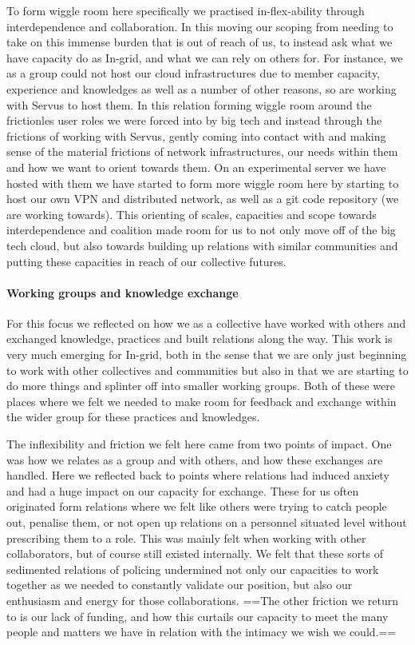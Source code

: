 To form wiggle room here specifically we practised in-flex-ability
through interdependence and collaboration. In this moving our scoping
from needing to take on this immense burden that is out of reach of us,
to instead ask what we have capacity do as In-grid, and what we can rely
on others for. For instance, we as a group could not host our cloud
infrastructures due to member capacity, experience and knowledges as
well as a number of other reasons, so are working with Servus to host
them. In this relation forming wiggle room around the frictionles user
roles we were forced into by big tech and instead through the frictions
of working with Servus, gently coming into contact with and making sense
of the material frictions of network infrastructures, our needs within
them and how we want to orient towards them. On an experimental server
we have hosted with them we have started to form more wiggle room here
by starting to host our own VPN and distributed network, as well as a
git code repository (we are working towards). This orienting of scales,
capacities and scope towards interdependence and coalition made room for
us to not only move off of the big tech cloud, but also towards building
up relations with similar communities and putting these capacities in
reach of our collective futures.

\hypertarget{working-groups-and-knowledge-exchange}{%
\paragraph{Working groups and knowledge
exchange}\label{working-groups-and-knowledge-exchange}}

For this focus we reflected on how we as a collective have worked with
others and exchanged knowledge, practices and built relations along the
way. This work is very much emerging for In-grid, both in the sense that
we are only just beginning to work with other collectives and
communities but also in that we are starting to do more things and
splinter off into smaller working groups. Both of these were places
where we felt we needed to make room for feedback and exchange within
the wider group for these practices and knowledges.

The inflexibility and friction we felt here came from two points of
impact. One was how we relates as a group and with others, and how these
exchanges are handled. Here we reflected back to points where relations
had induced anxiety and had a huge impact on our capacity for exchange.
These for us often originated form relations where we felt like others
were trying to catch people out, penalise them, or not open up relations
on a personnel situated level without prescribing them to a role. This
was mainly felt when working with other collaborators, but of course
still existed internally. We felt that these sorts of sedimented
relations of policing undermined not only our capacities to work
together as we needed to constantly validate our position, but also our
enthusiasm and energy for those collaborations. ==The other friction we
return to is our lack of funding, and how this curtails our capacity to
meet the many people and matters we have in relation with the intimacy
we wish we could.==

